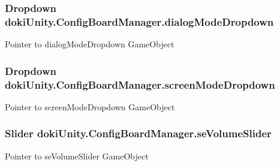 \subsubsection[{\texorpdfstring{dialog\+Mode\+Dropdown}{dialogModeDropdown}}]{\setlength{\rightskip}{0pt plus 5cm}Dropdown doki\+Unity.\+Config\+Board\+Manager.\+dialog\+Mode\+Dropdown}\hypertarget{classdoki_unity_1_1_config_board_manager_aeb587ba6d601a3739400fff42b602ed3}{}\label{classdoki_unity_1_1_config_board_manager_aeb587ba6d601a3739400fff42b602ed3}


Pointer to dialog\+Mode\+Dropdown Game\+Object 

\subsubsection[{\texorpdfstring{screen\+Mode\+Dropdown}{screenModeDropdown}}]{\setlength{\rightskip}{0pt plus 5cm}Dropdown doki\+Unity.\+Config\+Board\+Manager.\+screen\+Mode\+Dropdown}\hypertarget{classdoki_unity_1_1_config_board_manager_ac37a98165374ef322a2c23eb406ed3f0}{}\label{classdoki_unity_1_1_config_board_manager_ac37a98165374ef322a2c23eb406ed3f0}


Pointer to screen\+Mode\+Dropdown Game\+Object 

\subsubsection[{\texorpdfstring{se\+Volume\+Slider}{seVolumeSlider}}]{\setlength{\rightskip}{0pt plus 5cm}Slider doki\+Unity.\+Config\+Board\+Manager.\+se\+Volume\+Slider}\hypertarget{classdoki_unity_1_1_config_board_manager_a4dc8f3c0f549c5f8cee74368c806d634}{}\label{classdoki_unity_1_1_config_board_manager_a4dc8f3c0f549c5f8cee74368c806d634}


Pointer to se\+Volume\+Slider Game\+Object 

